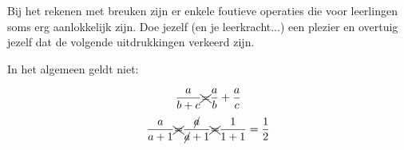 \documentclass{ximera}
\begin{document}
Bij het rekenen met breuken zijn er enkele foutieve operaties die voor leerlingen soms erg aanlokkelijk zijn. 
Doe jezelf (en je leerkracht...) een plezier en overtuig jezelf dat de volgende uitdrukkingen verkeerd zijn. 



    








\begin{remark} In het algemeen geldt niet:

\renewcommand\CancelColor{\color{red}}
$$ 
     \frac{a}{b+c} \xcancel{=} \frac{a}{b} + \frac{a}{c} 
$$ 
$$ 
     \frac{a}{a+1} \xcancel{=} \frac{\cancel{a}}{\cancel{a}+1}  \xcancel{=} \frac{1}{1+1} = \frac{1}{2} 
$$

\end{remark}
\end{document}
